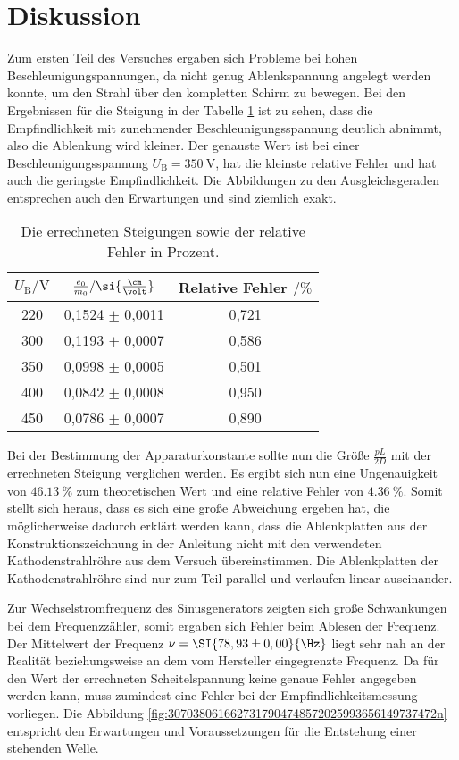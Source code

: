 \section{Diskussion}
\label{sec:Diskussion}
Zum ersten Teil des Versuches ergaben sich Probleme bei hohen Beschleunigungspannungen, da nicht genug Ablenkspannung angelegt werden konnte, um den Strahl über den kompletten Schirm zu bewegen. Bei den Ergebnissen für die Steigung in der Tabelle \ref{tab:zusammenfassung} ist zu sehen, dass die Empfindlichkeit mit zunehmender Beschleunigungsspannung deutlich abnimmt, also die Ablenkung wird kleiner. Der genauste Wert ist bei einer Beschleunigungsspannung $U_\text{B} = \SI{350}{\volt}$, hat die kleinste relative Fehler und hat auch die geringste Empfindlichkeit. Die Abbildungen zu den Ausgleichsgeraden entsprechen auch den Erwartungen und sind ziemlich exakt. 

\begin{table}[htbp]
	\centering
	\caption{Die errechneten Steigungen sowie der relative Fehler in Prozent.}
	\label{tab:zusammenfassung}
	\begin{tabular}{c c c}
		\toprule
		$U_\text{B} / \si{\volt}$ & $\frac{e_0}{m_0} /  \si{\frac{\cm}{\volt}}$ & Relative Fehler $ / \si{\percent}$\\
		\midrule
		220 & 0,1524 $\pm$ 0,0011 & 0,721 \\
		300 & 0,1193 $\pm$ 0,0007 & 0,586 \\
		350 & 0,0998 $\pm$ 0,0005 & 0,501 \\
		400 & 0,0842 $\pm$ 0,0008 & 0,950 \\
		450 & 0,0786 $\pm$ 0,0007 & 0,890 \\
		\bottomrule
	\end{tabular}
\end{table}
\FloatBarrier

Bei der Bestimmung der Apparaturkonstante sollte nun die Größe $\frac{pL}{2D}$ mit der errechneten Steigung verglichen werden. Es ergibt sich nun eine Ungenauigkeit von $\SI{46,13}{\percent}$ zum theoretischen Wert und eine relative Fehler von $\SI{4,36}{\percent}$. Somit stellt sich heraus, dass es sich eine große Abweichung ergeben hat, die möglicherweise dadurch erklärt werden kann, dass die Ablenkplatten aus der Konstruktionszeichnung in der Anleitung nicht mit den verwendeten Kathodenstrahlröhre aus dem Versuch übereinstimmen. Die Ablenkplatten der Kathodenstrahlröhre sind nur zum Teil parallel und verlaufen linear auseinander. 

Zur Wechselstromfrequenz des Sinusgenerators zeigten sich große Schwankungen bei dem Frequenzzähler, somit ergaben sich Fehler beim Ablesen der Frequenz. Der Mittelwert der Frequenz $\nu = \SI{78,93 \pm 0,00}{\Hz}$ liegt sehr nah an der Realität beziehungsweise an dem vom Hersteller eingegrenzte Frequenz. Da für den Wert der errechneten Scheitelspannung keine genaue Fehler angegeben werden kann, muss zumindest eine Fehler bei der Empfindlichkeitsmessung vorliegen. Die Abbildung \ref{fig:3070380616627317904748572025993656149737472n} entspricht den Erwartungen und Voraussetzungen für die Entstehung einer stehenden Welle. 

